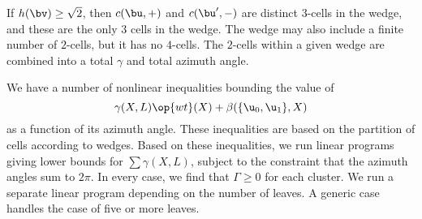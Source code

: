 If $h(\bv)\ge\sqrt2$, then $c(\bu,+)$ and $c(\bu',-)$ are distinct $3$-cells in the wedge,
and these are the only $3$ cells in the wedge.  The wedge may also include a finite number of 
$2$-cells, but it has no $4$-cells.  The $2$-cells within a given wedge are combined into a 
total $\gamma$ and total azimuth angle.

We have a number of nonlinear inequalities bounding the value of 
\[
\gamma(X,L) \op{wt}(X) + \beta(\{\u_0,\u_1\},X)
\]
 as a function
of its azimuth angle.  These inequalities are based on the partition of cells according to wedges.
Based on these inequalities,
we run linear programs giving lower bounds for $\sum \gamma(X,L)$, subject to the constraint
that the azimuth angles sum to $2\pi$.  In every case, we find that $\Gamma\ge0$ for each cluster.
We run a separate linear program depending on the number of leaves.  A generic case handles
the case of five or more leaves.


